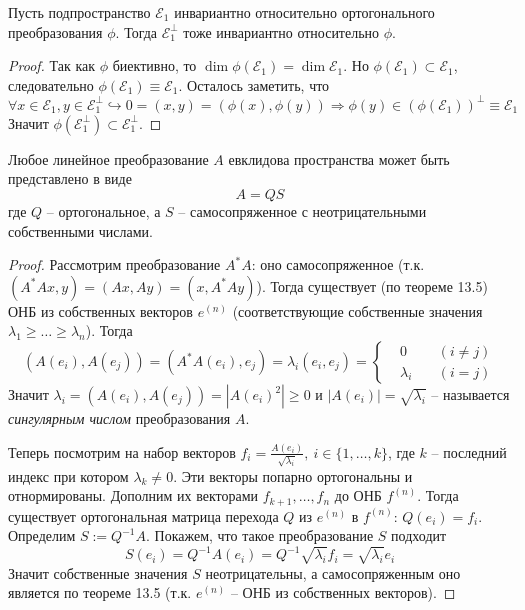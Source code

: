
\begin{theorem}
    Пусть подпространство $\mathcal{E}_1$ инвариантно относительно ортогонального преобразования $\phi$.  Тогда $\mathcal{E}_1^{\bot}$ тоже инвариантно относительно $\phi$.
\end{theorem}
\begin{proof}
    Так как $\phi$ биективно, то $\dim \phi(\mathcal{E}_1)=\dim \mathcal{E}_1$. Но $\phi(\mathcal{E}_1)\subset \mathcal{E}_1$, следовательно $\phi(\mathcal{E}_1)\equiv \mathcal{E}_1$. Осталось заметить, что 
    \[
    \forall x \in \mathcal{E}_1, y\in \mathcal{E}_1^{\bot} \hookrightarrow 0=(x,y)=(\phi(x),\phi(y)) \Rightarrow \phi(y)\in(\phi(\mathcal{E}_1))^{\bot}\equiv\mathcal{E}_1
    \]
    Значит $\phi(\mathcal{E}_1^{\bot})\subset \mathcal{E}_1^{\bot}$.
\end{proof}

\begin{theorem}
    Любое линейное преобразование $A$ евклидова пространства может быть представлено в виде 
    \[
    A=QS
    \]
    где $Q$ -- ортогональное, а $S$ -- самосопряженное с неотрицательными собственными числами.
\end{theorem}
\begin{proof}
    Рассмотрим преобразование $A^*A$: оно самосопряженное (т.к. $(A^*Ax,y)=(Ax,Ay)=(x,A^*Ay)$). Тогда существует (по теореме 13.5) ОНБ из собственных векторов $e^{(n)}$ (соответствующие собственные значения $\lambda_1\geqslant \dots \geqslant \lambda_n$). Тогда
    \[
    (A(e_i), A(e_j))=(A^*A(e_i),e_j)=\lambda_i(e_i, e_j)=\left\{
    \begin{aligned}
    &0 \quad &(i\neq j)\\
    &\lambda_i \quad &(i=j)
    \end{aligned}
    \right. 
    \]
    Значит $\lambda_i=(A(e_i),A(e_j))=|A(e_i)^2|\geqslant 0$ и $|A(e_i)|=\sqrt{\lambda_i}$ -- называется \textit{сингулярным числом} преобразования $A$. 

    Теперь посмотрим на набор векторов $f_i=\frac{A(e_i)}{\sqrt{\lambda_i}}, \ i\in \{1, \dots, k\}$, где $k$ -- последний индекс при котором $\lambda_k \neq 0$. Эти векторы попарно ортогональны и отнормированы.  Дополним их векторами $f_{k+1},\dots, f_n$ до ОНБ $f^{(n)}$. Тогда существует ортогональная матрица перехода $Q$ из $e^{(n)}$ в $f^{(n)}$: $Q(e_i)=f_i$. Определим $S:=Q^{-1}A$. Покажем, что такое преобразование $S$ подходит
    \[
    S(e_i)=Q^{-1}A(e_i)=Q^{-1}\sqrt{\lambda_i}f_i=\sqrt{\lambda_i}e_i
    \]
    Значит собственные значения $S$ неотрицательны, а самосопряженным оно является по теореме 13.5 (т.к. $e^{(n)}$ -- ОНБ из собственных векторов).
\end{proof}

